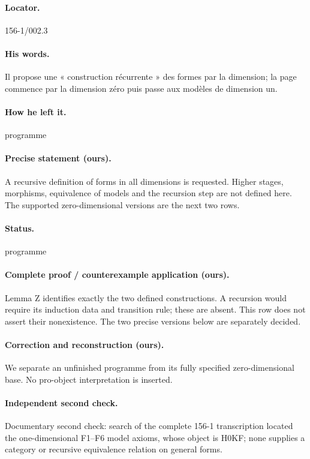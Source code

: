 \paragraph{Locator.} 156-1/002.3

\paragraph{His words.} Il propose une « construction récurrente » des formes par la dimension; la page commence par la dimension zéro puis passe aux modèles de dimension un.

\paragraph{How he left it.} programme

\paragraph{Precise statement (ours).} A recursive definition of forms in all dimensions is requested. Higher stages, morphisms, equivalence of models and the recursion step are not defined here. The supported zero-dimensional versions are the next two rows.

\paragraph{Status.} programme

\paragraph{Complete proof / counterexample application (ours).} Lemma Z identifies exactly the two defined constructions. A recursion would require its induction data and transition rule; these are absent. This row does not assert their nonexistence. The two precise versions below are separately decided.

\paragraph{Correction and reconstruction (ours).} We separate an unfinished programme from its fully specified zero-dimensional base. No pro-object interpretation is inserted.

\paragraph{Independent second check.} Documentary second check: search of the complete 156-1 transcription located the one-dimensional F1–F6 model axioms, whose object is H0KF; none supplies a category or recursive equivalence relation on general forms.

